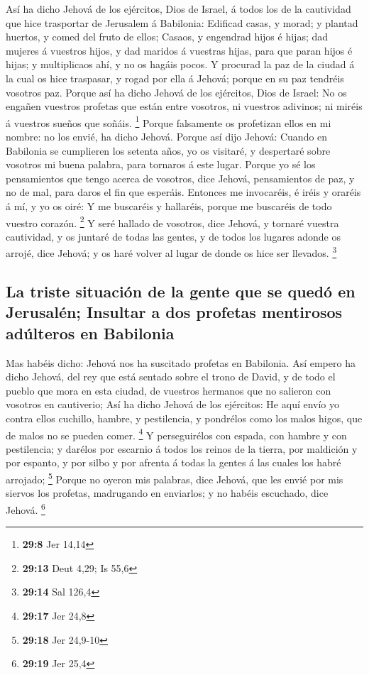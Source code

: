  Así ha dicho Jehová de los ejércitos, Dios de Israel, á
todos los de la cautividad que hice trasportar de Jerusalem á Babilonia:
 Edificad casas, y morad; y plantad huertos, y comed del
fruto de ellos;  Casaos, y engendrad hijos é hijas; dad
mujeres á vuestros hijos, y dad maridos á vuestras hijas, para que paran
hijos é hijas; y multiplicaos ahí, y no os hagáis pocos. 
Y procurad la paz de la ciudad á la cual os hice traspasar, y rogad por
ella á Jehová; porque en su paz tendréis vosotros paz. 
Porque así ha dicho Jehová de los ejércitos, Dios de Israel: No os
engañen vuestros profetas que están entre vosotros, ni vuestros
adivinos; ni miréis á vuestros sueños que soñáis. \footnote{\textbf{29:8}
  Jer 14,14}  Porque falsamente os profetizan ellos en mi
nombre: no los envié, ha dicho Jehová.  Porque así dijo
Jehová: Cuando en Babilonia se cumplieren los setenta años, yo os
visitaré, y despertaré sobre vosotros mi buena palabra, para tornaros á
este lugar.  Porque yo sé los pensamientos que tengo
acerca de vosotros, dice Jehová, pensamientos de paz, y no de mal, para
daros el fin que esperáis.  Entonces me invocaréis, é
iréis y oraréis á mí, y yo os oiré:  Y me buscaréis y
hallaréis, porque me buscaréis de todo vuestro corazón. \footnote{\textbf{29:13}
  Deut 4,29; Is 55,6}  Y seré hallado de vosotros, dice
Jehová, y tornaré vuestra cautividad, y os juntaré de todas las gentes,
y de todos los lugares adonde os arrojé, dice Jehová; y os haré volver
al lugar de donde os hice ser llevados. \footnote{\textbf{29:14} Sal
  126,4}

\hypertarget{la-triste-situaciuxf3n-de-la-gente-que-se-queduxf3-en-jerusaluxe9n-insultar-a-dos-profetas-mentirosos-aduxfalteros-en-babilonia}{%
\subsection{La triste situación de la gente que se quedó en Jerusalén;
Insultar a dos profetas mentirosos adúlteros en
Babilonia}\label{la-triste-situaciuxf3n-de-la-gente-que-se-queduxf3-en-jerusaluxe9n-insultar-a-dos-profetas-mentirosos-aduxfalteros-en-babilonia}}

 Mas habéis dicho: Jehová nos ha suscitado profetas en
Babilonia.  Así empero ha dicho Jehová, del rey que está
sentado sobre el trono de David, y de todo el pueblo que mora en esta
ciudad, de vuestros hermanos que no salieron con vosotros en cautiverio;
 Así ha dicho Jehová de los ejércitos: He aquí envío yo
contra ellos cuchillo, hambre, y pestilencia, y pondrélos como los malos
higos, que de malos no se pueden comer. \footnote{\textbf{29:17} Jer
  24,8}  Y perseguirélos con espada, con hambre y con
pestilencia; y darélos por escarnio á todos los reinos de la tierra, por
maldición y por espanto, y por silbo y por afrenta á todas la gentes á
las cuales los habré arrojado; \footnote{\textbf{29:18} Jer 24,9-10}
 Porque no oyeron mis palabras, dice Jehová, que les
envié por mis siervos los profetas, madrugando en enviarlos; y no habéis
escuchado, dice Jehová. \footnote{\textbf{29:19} Jer 25,4}

